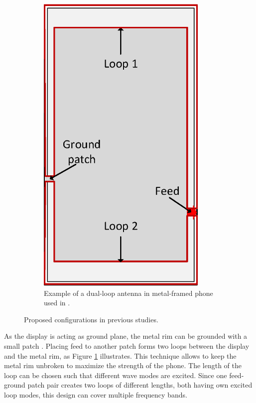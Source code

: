 \begin{figure}[H]
\begin{subfigure}[b]{0.4\textwidth}
        \includegraphics[width=0.9\textwidth]{img/dual_loop.eps}
        \caption{Example of a dual-loop antenna in metal-framed phone used in \cite{ban_dual_loop, stanley_lte_mimo}.}
        \label{fig:dual_loop}
    \end{subfigure}
    \caption{Proposed configurations in previous studies.}
    \label{fig:metal_rim_examples}
\end{figure}

As the display is acting as ground plane, the metal rim can be grounded with a small patch \cite{ban_dual_loop, stanley_lte_mimo}. Placing feed to another patch forms two loops between the display and the metal rim, as Figure \ref{fig:dual_loop} illustrates. This technique allows to keep the metal rim unbroken to maximize the strength of the phone. The length of the loop can be chosen such that different wave modes are excited. Since one feed-ground patch pair creates two loops of different lengths, both having own excited loop modes, this design can cover multiple frequency bands. %

